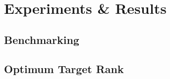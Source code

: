 \chapter{Experiments \& Results}\label{chpt:3}
\section{Benchmarking}\label{sec:3_1_benchmarking}

\section{Optimum Target Rank}\label{sec:3_2_svd_params}
